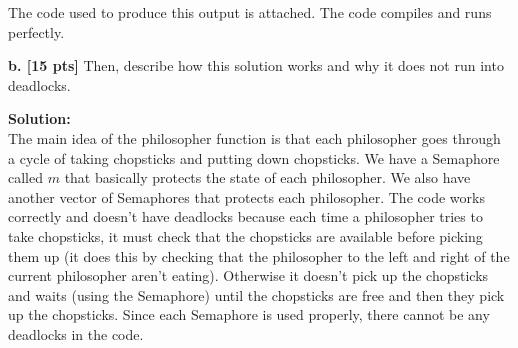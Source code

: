 \documentclass[12pt]{article}
\begin{document}
The code used to produce this output is attached. The code compiles and runs perfectly. 

{\bf b. [15 pts]} Then, describe how this solution works and why it does not run into deadlocks.

{\bf Solution:}\\

The main idea of the philosopher function is that each philosopher goes through a cycle of taking chopsticks and putting down chopsticks. We have a Semaphore called $m$ that basically protects the state of each philosopher. We also have another vector of Semaphores that protects each philosopher. The code works correctly and doesn't have deadlocks because each time a philosopher tries to take chopsticks, it must check that the chopsticks are available before picking them up (it does this by checking that the philosopher to the left and right of the current philosopher aren't eating). Otherwise it doesn't pick up the chopsticks and waits (using the Semaphore) until the chopsticks are free and then they pick up the chopsticks. Since each Semaphore is used properly, there cannot be any deadlocks in the code. 
\end{document}
